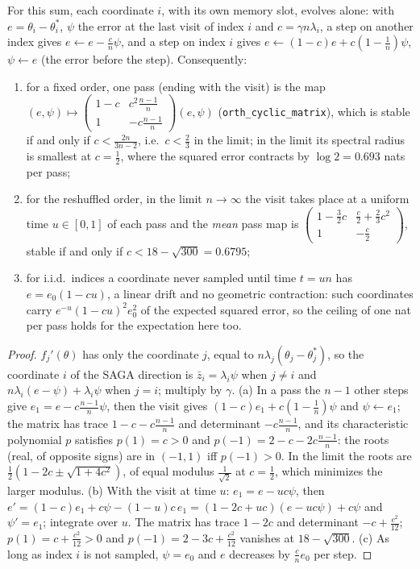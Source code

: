 \begin{proposition}\label{prop:B4-orth}
For this sum, each coordinate $i$, with its own memory slot, evolves alone: with $e=\theta_i-\theta_i^\ast$, $\psi$ the error at the last visit of index $i$ and $c=\gamma n\lambda_i$, a step on another index gives $e\leftarrow e-\frac cn\psi$, and a step on index $i$ gives $e\leftarrow(1-c)e+c(1-\frac1n)\psi$, $\psi\leftarrow e$ (the error before the step). Consequently:
\begin{enumerate}[label=(\alph*)]
\item for a fixed order, one pass (ending with the visit) is the map $(e,\psi)\mapsto\begin{pmatrix}1-c&c^2\frac{n-1}n\\1&-c\frac{n-1}n\end{pmatrix}(e,\psi)$ (\texttt{orth\_cyclic\_matrix}), which is stable if and only if $c<\frac{2n}{3n-2}$, i.e.\ $c<\frac23$ in the limit; in the limit its spectral radius is smallest at $c=\frac12$, where the squared error contracts by $\log2=0.693$ nats per pass;
\item for the reshuffled order, in the limit $n\to\infty$ the visit takes place at a uniform time $u\in[0,1]$ of each pass and the \emph{mean} pass map is $\begin{pmatrix}1-\frac32c&\frac c2+\frac23c^2\\1&-\frac c2\end{pmatrix}$, stable if and only if $c<18-\sqrt{300}=0.6795$;
\item for i.i.d.\ indices a coordinate never sampled until time $t=un$ has $e=e_0(1-cu)$, a linear drift and no geometric contraction: such coordinates carry $e^{-u}(1-cu)^2e_0^2$ of the expected squared error, so the ceiling of one nat per pass holds for the expectation here too.
\end{enumerate}
\end{proposition}
\begin{proof}
$f_j'(\theta)$ has only the coordinate $j$, equal to $n\lambda_j(\theta_j-\theta_j^\ast)$, so the coordinate $i$ of the SAGA direction is $\bar z_i=\lambda_i\psi$ when $j\ne i$ and $n\lambda_i(e-\psi)+\lambda_i\psi$ when $j=i$; multiply by $\gamma$. (a) In a pass the $n-1$ other steps give $e_1=e-c\frac{n-1}n\psi$, then the visit gives $(1-c)e_1+c(1-\frac1n)\psi$ and $\psi\leftarrow e_1$; the matrix has trace $1-c-c\frac{n-1}n$ and determinant $-c\frac{n-1}n$, and its characteristic polynomial $p$ satisfies $p(1)=c>0$ and $p(-1)=2-c-2c\frac{n-1}n$: the roots (real, of opposite signs) are in $(-1,1)$ iff $p(-1)>0$. In the limit the roots are $\frac12(1-2c\pm\sqrt{1+4c^2})$, of equal modulus $\frac1{\sqrt2}$ at $c=\frac12$, which minimizes the larger modulus. (b) With the visit at time $u$: $e_1=e-uc\psi$, then $e'=(1-c)e_1+c\psi-(1-u)c\,e_1=(1-2c+uc)(e-uc\psi)+c\psi$ and $\psi'=e_1$; integrate over $u$. The matrix has trace $1-2c$ and determinant $-c+\frac{c^2}{12}$; $p(1)=c+\frac{c^2}{12}>0$ and $p(-1)=2-3c+\frac{c^2}{12}$ vanishes at $18-\sqrt{300}$. (c) As long as index $i$ is not sampled, $\psi=e_0$ and $e$ decreases by $\frac cne_0$ per step.
\end{proof}

